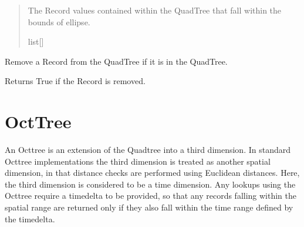 \documentclass[letterpaper,10pt,english]{sphinxmanual}
\begin{document}
\begin{fulllineitems}
\begin{fulllineitems}
\begin{quote}
\begin{description}
\sphinxAtStartPar
The Record values contained within the QuadTree that fall
within the bounds of ellipse.

\sphinxAtStartPar
list{[}{\hyperref[\detokenize{record:GeoSpatialTools.record.Record}]{}}{]}

\end{description}\end{quote}

\end{fulllineitems}


\begin{fulllineitems}
\label{\detokenize{quadtree:GeoSpatialTools.quadtree.QuadTree.remove}}
\pysigstartsignatures
\pysiglinewithargsret
{}
{}
{}
\pysigstopsignatures
\sphinxAtStartPar
Remove a Record from the QuadTree if it is in the QuadTree.

\sphinxAtStartPar
Returns True if the Record is removed.
\begin{quote}\begin{description}
\sphinxAtStartPar
{}

\end{description}\end{quote}

\end{fulllineitems}


\end{fulllineitems}


\sphinxstepscope


\chapter{OctTree}
\label{\detokenize{octtree:octtree}}\label{\detokenize{octtree::doc}}
\sphinxAtStartPar
An Octtree is an extension of the Quadtree into a third dimension. In standard Octtree implementations the third
dimension is treated as another spatial dimension, in that distance checks are performed using Euclidean distances.
Here, the third dimension is considered to be a time dimension. Any look\sphinxhyphen{}ups using the Octtree require a timedelta to be
provided, so that any records falling within the spatial range are returned only if they also fall within the time range
defined by the timedelta.
\end{document}
